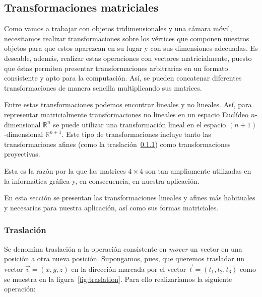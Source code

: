 \subsection{Transformaciones matriciales}
\label{makereference5.4.1}

Como vamos a trabajar con objetos tridimensionales y una cámara móvil,
necesitamos realizar transformaciones sobre los vértices que componen nuestros
objetos para que estos aparezcan en su lugar y con sus dimensiones adecuadas.
Es deseable, además, realizar estas operaciones con vectores matricialmente,
puesto que éstas permiten presentar transformaciones arbitrarias en un
formato consistente y apto para la computación. Así, se pueden concatenar
diferentes transformaciones de manera sencilla multiplicando sus matrices. 

Entre estas transformaciones podemos encontrar lineales y no lineales. Así, para
representar matricialmente transformaciones no lineales en un espacio Euclídeo
$n$-dimensional $\mathbb{R}^n$ se puede utilizar una transformación lineal en el
espacio $(n+1)$-dimensional $\mathbb{R}^{n+1}$. Este tipo de transformaciones
incluye tanto las transformaciones afines (como la
traslación~\ref{makereference5.4.1.1}) como transformaciones proyectivas.

Esta es la razón por la que las matrices $4 \times 4$ son tan ampliamente
utilizadas en la informática gráfica y, en consecuencia, en nuestra
aplicación.

En esta sección se presentan las transformaciones lineales y afines más
habituales y necesarias para nuestra aplicación, así como sus formas
matriciales. 

\subsubsection{Traslación}
\label{makereference5.4.1.1}

Se denomina traslación a la operación consistente en \textit{mover} un vector en
una posición a otra nueva posición. Supongamos, pues, que queremos trasladar un
vector $\overrightarrow{v} = (x,y,z)$ en la dirección marcada por el vector
$\overrightarrow{t} = (t_1, t_2, t_3)$ como se muestra en la
figura~\ref{fig:traslation}. Para ello realizaríamos la siguiente operación:

